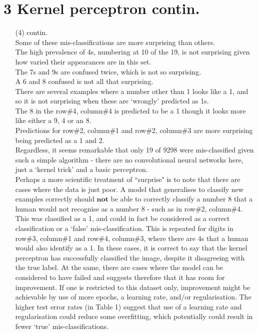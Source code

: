 \documentclass[a4paper,12pt]{article}
\begin{document}
\section*{3 Kernel perceptron contin.}
\begin{enumerate}

\item[(4)] contin.\\
Some of these mis-classifications are more surprising than others. \\
The high prevalence of 4s, numbering at 10 of the 19, is not surprising given how varied their appearances are in this set.\\
The 7s and 9s are confused twice, which is not so surprising.\\
A 6 and 8 confused is not all that surprising.\\
There are several examples where a number other than 1 looks like a 1, and so it is not surprising when these are `wrongly' predicted as 1s.\\
The 8 in the row\#4, column\#4 is predicted to be a 1 though it looks more like either a 9, 4 or an 8.\\ 
Predictions for row\#2, column\#1 and row\#2, column\#3 are more surprising being predicted as a 1 and 2.\\
Regardless, it seems remarkable that only 19 of 9298 were mis-classified given such a simple algorithm - there are no convolutional neural networks here, just a `kernel trick' and a basic perceptron.\\
Perhaps a more scientific treatment of ``surprise" is to note that there are cases where the data is just poor. A model that generalises to classify new examples correctly should $\textbf{not}$ be able to correctly classify a number 8 that a human would not recognise as a number 8 - such as in row\#2, column\#4. This was classified as a 1, and could in fact be considered as a correct classification or a `false' mis-classification. This is repeated for digits in row\#3, column\#1 and row\#4, column\#3, where there are 4s that a human would also identify as a 1. In these cases, it is correct to say that the kernel perceptron has successfully classified the image, despite it disagreeing with the true label. At the same, there are cases where the model can be considered to have failed and suggests therefore that it has room for improvement. If one is restricted to this dataset only, improvement might be achievable by use of more epochs, a learning rate, and/or regularisation. The higher test error rates (in Table 1) suggest that use of a learning rate and regularisation could reduce some overfitting, which potentially could result in fewer `true' mis-classifications.


\end{enumerate}
\end{document}
